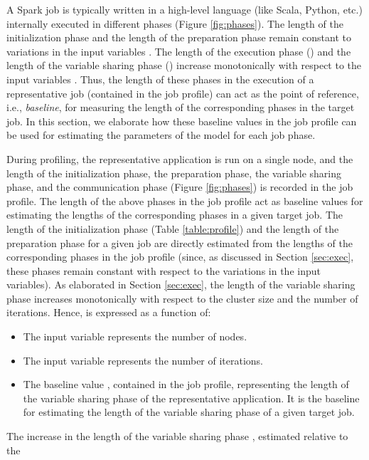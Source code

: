 \documentclass[conference]{IEEEtran}
\begin{document}
A Spark job is typically written in a high-level language (like Scala, Python, etc.) internally executed in different phases (Figure
   \ref{fig:phases}). The length of the initialization phase  and the length of the
  preparation phase  remain constant to variations in the input variables \cite{Zaharia:2012:RDD:2228298.2228301}. The length of
  the execution phase () and the length of the variable
    sharing phase  () increase monotonically with respect to the input variables \cite{Zaharia:2012:RDD:2228298.2228301}. Thus, the length
    of these phases in the execution of a representative job (contained in the job profile) can act as the point of reference, i.e., \emph{baseline}, for measuring
    the length of the corresponding phases in the target job.  In this section, we elaborate how these baseline values in the job profile
   can be used for estimating the parameters of the model for each job phase. \par During profiling,
 the representative application
  is run on a single node, and the length of the initialization phase, the preparation phase, the variable sharing phase, and the communication phase (Figure \ref{fig:phases}) is recorded in the job profile. The length  of the
 above phases in the job profile act as baseline values for estimating the lengths of the corresponding phases in a given target job.  The length of the initialization phase  (Table \ref{table:profile}) and the length of the
  preparation phase  for a given job are directly estimated from the lengths of the corresponding phases in the job
  profile (since, as discussed in Section \ref{sec:exec}, these phases remain constant with respect to the variations in the input variables).
  As elaborated in Section \ref{sec:exec}, the length of the variable sharing phase  increases monotonically \cite{Zaharia:2012:RDD:2228298.2228301}
  with respect to the cluster size and the number of iterations. Hence,  is expressed as a function of:
 \begin{itemize}
 \item The input   variable  represents
 the number of nodes. \item  The input variable  represents the number of iterations. \item  The baseline value , contained in the job profile, representing the length of the
 variable sharing phase of the representative application. It is the
 baseline for estimating the length of the variable sharing phase  of a given target job. \end{itemize}
 The increase in the length of the variable sharing phase , estimated relative to the
\end{document}
